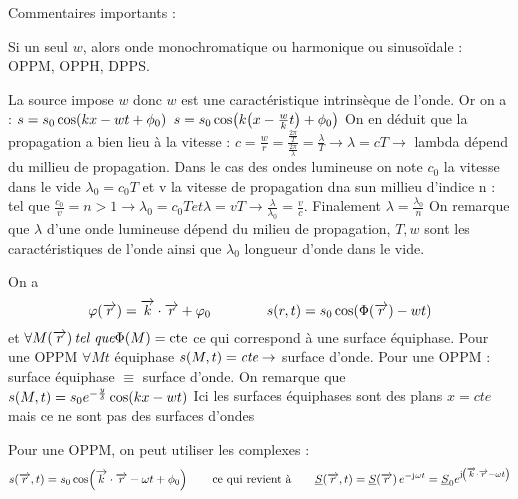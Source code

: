 \documentclass[a4paper,french,bookmarks]{book}
\begin{document}
    Commentaires importants :
    \begin{psse}
        \item Si un seul $w$, alors onde monochromatique ou harmonique ou sinusoïdale : OPPM, OPPH, DPPS.
        
        \item La source impose $w$ donc $w$ est une caractéristique intrinsèque de l'onde.
    Or on a : $s = s_0 \cos \!\left(k x - w t + \phi_0\right)$
    $s = s_0\cos\!\left(k\!\left(x - \frac{w}{k}t\right) + \phi_0\right)$
    On en déduit que la propagation a bien lieu à la vitesse : $c = \frac{w}{r} = \frac{\frac{2\pi}{T}}{\frac{2\pi}{\lambda}} = \frac{\lambda}{T} \to \lambda = c T \to$ lambda dépend du millieu de propagation.
    Dans le cas des ondes lumineuse on note $c_0$ la vitesse dans le vide $\lambda_0 = c_0 T$ et v la vitesse de propagation dna sun millieu d'indice n : tel que $\frac{c_0}{v} = n > 1 \to \lambda_0 = c_0 T \textit{et} \lambda = v T \to \frac{\lambda}{\lambda_0} = \frac{v}{c}$. Finalement $\lambda = \frac{\lambda_0}{n}$
    On remarque que $\lambda$ d'une onde lumineuse dépend du milieu de propagation, $T, w$ sont les caractéristiques de l'onde ainsi que $\lambda_0$ longueur d'onde dans le vide.
    
        \item On a 
        \[\varphi\!\left(\overrightarrow{r}\right) = \overrightarrow{k} \cdot \overrightarrow{r} + \varphi_0 \qquad\qquad s\!\left(r, t\right) = s_0\cos\!\left(\Phi\!\left(\overrightarrow{r}\right) - w t\right)\]
        et $\forall M\!\left(\overrightarrow{r}\right) \textit{tel que} \Phi\!\left(M\right) = \text{cte}$ ce qui correspond à une surface équiphase.
        Pour une OPPM $\forall M t$ équiphase $s\!\left(M, t\right) = \textit{cte} \to$ surface d'onde. Pour une OPPM : surface équiphase $\equiv$ surface d'onde.
    On remarque que $s\!\left(M, t\right) = s_0 e^{-\frac{y}{\delta}}\cos\!\left(kx - wt\right)$
    Ici les surfaces équiphases sont des plans $x = \textit{cte}$ mais ce ne sont pas des surfaces d'ondes
    
    
        \item Pour une OPPM, on peut utiliser les complexes :
        \[ s\!\left(\overrightarrow{r}, t\right) = s_0\cos\!\left(\overrightarrow{k} \cdot \overrightarrow{r} -\omega t + \phi_0\right) \qquad\text{ce qui revient à}\qquad \underline S\!\left(\overrightarrow{r}, t\right) = \underline S\!\left(\overrightarrow{r}\right)e^{-\mathrm{j\mkern1mu} \omega t} = \underline S_0 e^{\mathrm{j\mkern1mu}\!\left(\overrightarrow{k} \cdot \overrightarrow{r} - \omega t\right)}\]
        


\end{psse}
\end{document}
